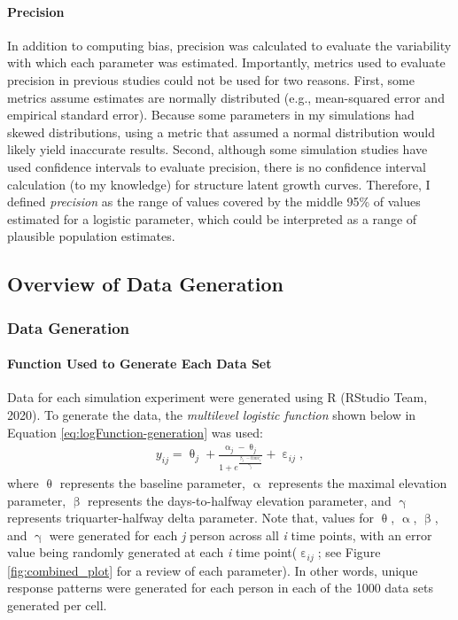 \documentclass[
12pt, %
twoside,
english]{guelphthesis}
\theoremstyle{definition}
\theoremstyle{definition}
\theoremstyle{definition}
\theoremstyle{definition}
\theoremstyle{remark}
\begin{document}
\hypertarget{pres-precision}{%
\paragraph{Precision}\label{pres-precision}}

In addition to computing bias, precision was calculated to evaluate the variability with which each parameter was estimated. Importantly, metrics used to evaluate precision in previous studies could not be used for two reasons. First, some metrics assume estimates are normally distributed (e.g., mean-squared error and empirical standard error). Because some parameters in my simulations had skewed distributions, using a metric that assumed a normal distribution would likely yield inaccurate results. Second, although some simulation studies have used confidence intervals to evaluate precision, there is no confidence interval calculation (to my knowledge) for structure latent growth curves. Therefore, I defined \emph{precision} as the range of values covered by the middle 95\% of values estimated for a logistic parameter, which could be interpreted as a range of plausible population estimates.

\hypertarget{data-generation}{%
\subsection{Overview of Data Generation}\label{data-generation}}

\hypertarget{data-generation-1}{%
\subsubsection{Data Generation}\label{data-generation-1}}

\hypertarget{function-used-to-generate-each-data-set}{%
\paragraph{Function Used to Generate Each Data Set}\label{function-used-to-generate-each-data-set}}

Data for each simulation experiment were generated using R (RStudio Team, 2020).
To generate the data, the \emph{multilevel logistic function} shown below
in Equation \eqref{eq:logFunction-generation} was used:
\begin{align}
  y_{ij} = \uptheta_j + \frac{\upalpha_j - \uptheta_j}{{1 + e^\frac{\upbeta_j - time_i}{\upgamma_j}}} + \upepsilon_{ij}, 
\label{eq:logFunction-generation}
\end{align}
\noindent where \(\uptheta\) represents the baseline parameter, \(\upalpha\)
represents the maximal elevation parameter, \(\upbeta\) represents the
days-to-halfway elevation parameter, and \(\upgamma\) represents
triquarter-halfway delta parameter. Note that, values for \(\uptheta\),
\(\upalpha\), \(\upbeta\), and \(\upgamma\) were generated for each \emph{j} person
across all \emph{i} time points, with an error value being randomly generated
at each \emph{i} time point(\(\upepsilon_{ij}\); see Figure \ref{fig:combined_plot} for a review of each parameter). In other words, unique response patterns were generated for each person in each of the 1000
data sets generated per cell.
\end{document}
